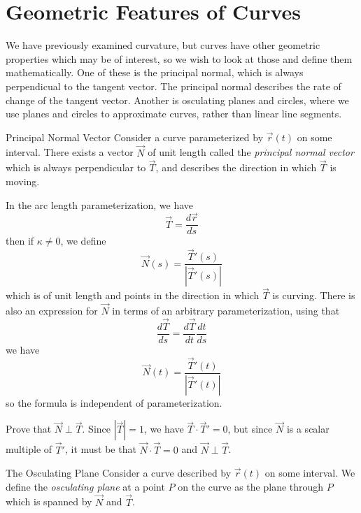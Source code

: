 \documentclass[../main.tex]{subfiles}
\begin{document}
        \section{Geometric Features of Curves}
        We have previously examined curvature, but curves have other geometric properties which may be of interest, so we wish to look at those and define them mathematically. One of these is the principal normal, which is always perpendicual to the tangent vector. The principal normal describes the rate of change of the tangent vector. Another is osculating planes and circles, where we use planes and circles to approximate curves, rather than linear  line segments.
        \begin{definition}{Principal Normal Vector}{}
                Consider a curve parameterized by \(\vec{r}(t)\) on some interval. There exists a vector \(\vec{N}\) of unit length called the \emph{principal normal  vector} which is always perpendicular to \(\vec{T}\), and describes the direction in which \(\vec{T}\) is moving.

                In the arc length parameterization, we have
                \[
                \vec{T}=\frac{d\vec{r}}{ds}
                \]
                then if \(\kappa\neq0\), we define
                \[
                \vec{N}(s)=\frac{\vec{T}'(s)}{|\vec{T}'(s)|}
                \]
                which is of unit length and points in the direction in which \(\vec{T}\) is curving. There is also an expression for \(\vec{N}\) in terms of an arbitrary parameterization, using that
                \[
                \frac{d\vec{T}}{ds}=\frac{d\vec{T}}{dt}\frac{dt}{ds}
                \]
                we have
                \[
                \vec{N}(t)=\frac{\vec{T}'(t)}{|\vec{T}'(t)|}
                \]
                so the formula is independent of parameterization.
        \end{definition}
        \begin{theorem}{}{}
                Prove that \(\vec{N}\perp\vec{T}\).
                \tcblower
                Since \(|\vec{T}|=1\), we have \(\vec{T}\cdot\vec{T}'=0\), but since \(\vec{N}\) is a scalar multiple of \(\vec{T}'\), it must be that \(\vec{N}\cdot\vec{T}=0\) and \(\vec{N}\perp\vec{T}\).
        \end{theorem}
        \begin{definition}{The Osculating Plane}{}
                Consider a curve described by \(\vec{r}(t)\) on some interval. We define the \emph{osculating plane} at a point \(P\) on the curve as the plane through \(P\) which is spanned by \(\vec{N}\) and \(\vec{T}\).
        \end{definition}
\end{document}
